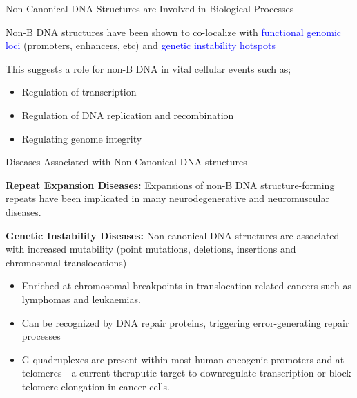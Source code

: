 \documentclass{beamer}
\begin{document}
	\begin{frame}{Non-Canonical DNA Structures are Involved in Biological Processes}
		
		Non-B DNA structures have been shown to co-localize with \textcolor{blue}{functional genomic loci} (promoters, enhancers, etc) and \textcolor{blue}{genetic instability hotspots} \newline
		
		This suggests a role for non-B DNA in vital cellular events such as;
		\begin{itemize}
			\item Regulation of transcription
			\item Regulation of DNA replication and recombination
			\item Regulating genome integrity
		\end{itemize}
	
		\centering
		
	\end{frame}

	\begin{frame}{Diseases Associated with Non-Canonical DNA structures}
		
	\textbf{\color{blue}Repeat Expansion Diseases:} Expansions of non-B DNA structure-forming repeats have been implicated in many neurodegenerative and neuromuscular diseases. \newline
	
	\textbf{\color{blue}Genetic Instability Diseases:} Non-canonical DNA structures are associated with increased mutability (point mutations, deletions, insertions and chromosomal translocations)
	
	\begin{itemize}
		\item Enriched at chromosomal breakpoints in translocation-related cancers such as lymphomas and leukaemias.
		\item Can be recognized by DNA repair proteins, triggering error-generating repair processes
		\item G-quadruplexes are present within most human oncogenic promoters and at telomeres - a current theraputic target to downregulate transcription or block telomere elongation in cancer cells.
	\end{itemize}
	
	
	\end{frame}
\end{document}
